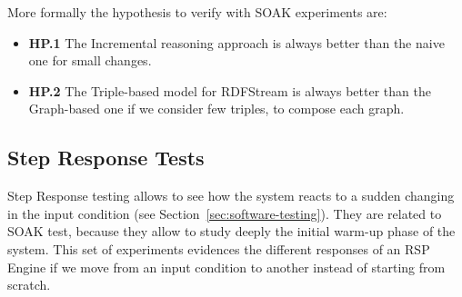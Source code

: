 More formally the hypothesis to verify with SOAK experiments are:
\begin{itemize}
\item \textbf{HP.1} The Incremental reasoning approach is always better than the naive one for small changes.
\item \textbf{HP.2} The Triple-based model for RDFStream is always better than the Graph-based one if we consider few triples, to compose each graph.
\end{itemize}


\subsection{Step Response Tests}\label{sec:step-es}

Step Response testing allows to see how the system reacts to a sudden changing in the input condition (see Section~\ref{sec:software-testing}). They are related to SOAK test, because they allow to study deeply the initial warm-up phase of the system. This set of experiments evidences the different responses of an RSP Engine if we move from an input condition to another instead of starting from scratch.


